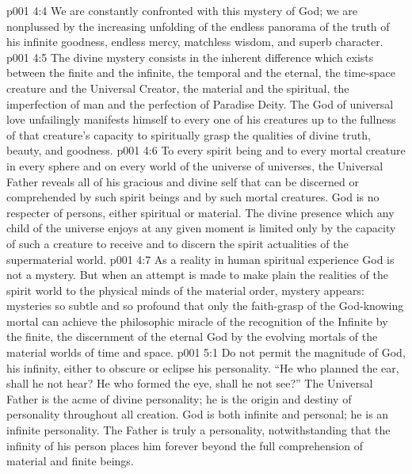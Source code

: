 \vs p001 4:4 \pc We are constantly confronted with this mystery of God; we are nonplussed by the increasing unfolding of the endless panorama of the truth of his infinite goodness, endless mercy, matchless wisdom, and superb character.
\vs p001 4:5 \pc The divine mystery consists in the inherent difference which exists between the finite and the infinite, the temporal and the eternal, the time\hyp{}space creature and the Universal Creator, the material and the spiritual, the imperfection of man and the perfection of Paradise Deity. The God of universal love unfailingly manifests himself to every one of his creatures up to the fullness of that creature’s capacity to spiritually grasp the qualities of divine truth, beauty, and goodness.
\vs p001 4:6 To every spirit being and to every mortal creature in every sphere and on every world of the universe of universes, the Universal Father reveals all of his gracious and divine self that can be discerned or comprehended by such spirit beings and by such mortal creatures. God is no respecter of persons, either spiritual or material. The divine presence which any child of the universe enjoys at any given moment is limited only by the capacity of such a creature to receive and to discern the spirit actualities of the supermaterial world.
\vs p001 4:7 As a reality in human spiritual experience God is not a mystery. But when an attempt is made to make plain the realities of the spirit world to the physical minds of the material order, mystery appears: mysteries so subtle and so profound that only the faith\hyp{}grasp of the God\hyp{}knowing mortal can achieve the philosophic miracle of the recognition of the Infinite by the finite, the discernment of the eternal God by the evolving mortals of the material worlds of time and space.
\vs p001 5:1 Do not permit the magnitude of God, his infinity, either to obscure or eclipse his personality. “He who planned the ear, shall he not hear? He who formed the eye, shall he not see?” The Universal Father is the acme of divine personality; he is the origin and destiny of personality throughout all creation. God is both infinite and personal; he is an infinite personality. The Father is truly a personality, notwithstanding that the infinity of his person places him forever beyond the full comprehension of material and finite beings.
